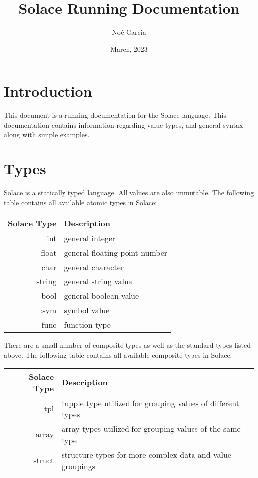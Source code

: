 \documentclass{article}
\title{
	\vspace{2in}
	\textmd{\textbf{Solace Running Documentation}}
	\vspace{3in}
}
\author{No\'e Garcia}
\date{March, 2023}
\begin{document}
\maketitle
\newpage

\section{Introduction}

This document is a running documentation for the Solace language. This documentation
contains information regarding value types, and general syntax along with simple examples.

\section{Types}

Solace is a statically typed language. All values are also immutable. The following table
contains all available atomic types in Solace:

\begin{center}
\begin{tabular}{|r|l|}
	\hline
	Solace Type & Description \\
	\hline
	\hline
	int & general integer \\
	float & general floating point number \\
	char & general character \\
	string & general string value \\
	bool & general boolean value \\
	:sym & symbol value \\
	func & function type \\
	\hline
\end{tabular}
\end{center}

There are a small number of composite types as well as the standard types listed above.
The following table contains all available composite types in Solace:

\begin{center}
\begin{tabular}{|r|l|}
	\hline
	Solace Type & Description \\
	\hline
	tpl & tupple type utilized for grouping values of different types \\
	array & array types utilized for grouping values of the same type \\
	struct & structure types for more complex data and value groupings \\
	\hline
\end{tabular}
\end{center}
\end{document}
